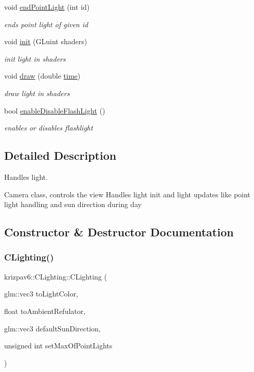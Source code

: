 \begin{DoxyCompactItemize}
void \mbox{\hyperlink{classkrizpav6_1_1_c_lighting_af08088f703aab3ea30c995619c033b40}{end\+Point\+Light}} (int id)
\begin{DoxyCompactList}\small\item\em ends point light of given id \end{DoxyCompactList}\item 
void \mbox{\hyperlink{classkrizpav6_1_1_c_lighting_af451ddd4f4cf7460785a5a7ff32e34a6}{init}} (G\+Luint shaders)
\begin{DoxyCompactList}\small\item\em init light in shaders \end{DoxyCompactList}\item 
void \mbox{\hyperlink{classkrizpav6_1_1_c_lighting_acf4b2db3db22750c3b21d18370df3436}{draw}} (double \mbox{\hyperlink{namespacekrizpav6_a8891720fdfe0575d613886ce3cf96223}{time}})
\begin{DoxyCompactList}\small\item\em draw light in shaders \end{DoxyCompactList}\item 
bool \mbox{\hyperlink{classkrizpav6_1_1_c_lighting_a144ad5a2bfc5b79118ac17b356ac8550}{enable\+Disable\+Flash\+Light}} ()
\begin{DoxyCompactList}\small\item\em enables or disables flashlight \end{DoxyCompactList}\end{DoxyCompactItemize}


\subsection{Detailed Description}
Handles light. 

Camera class, controls the view Handles light init and light updates like point light handling and sun direction during day 

\subsection{Constructor \& Destructor Documentation}
\mbox{\label{classkrizpav6_1_1_c_lighting_a662c0e5621bed293f611157a1c95a5aa}} 
\subsubsection{\texorpdfstring{CLighting()}{CLighting()}}
{\footnotesize\ttfamily krizpav6\+::\+C\+Lighting\+::\+C\+Lighting (\begin{DoxyParamCaption}\item[{glm\+::vec3}]{to\+Light\+Color,  }\item[{float}]{to\+Ambient\+Refulator,  }\item[{glm\+::vec3}]{default\+Sun\+Direction,  }\item[{unsigned int}]{set\+Max\+Of\+Point\+Lights }\end{DoxyParamCaption})}



